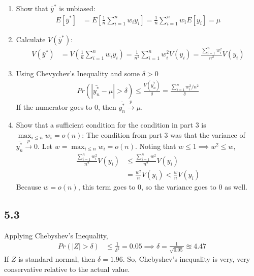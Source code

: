 \documentclass{article}[14pt]
\begin{document}
    \begin{enumerate}
        \item Show that $\bar{y}^*$ is unbiased:
        \begin{align*}
            E[\bar{y}^*] &= E[\frac{1}{n} \sum_{i=1}^n w_i y_i] = \frac{1}{n} \sum_{i=1}^n w_i E[y_i] = \mu
        \end{align*}
        \item Calculate $V(\bar{y}^*)$:
        \begin{align*}
            V(\bar{y}^*) &= V(\frac{1}{n} \sum_{i=1}^n w_i y_i) = \frac{1}{n^2} \sum_{i=1}^n w_i^2 V(y_i) = \frac{\sum_{i=1}^n w_i^2}{n^2} V(y_i)
        \end{align*}
        \item Using Chevychev's Inequality and some $\delta > 0$
        \begin{align*}
            Pr(|\bar{y^*_n} - \mu| > \delta) \leq \frac{V(\bar{y^*_n})}{\delta} = \frac{\sum_{i=1}^n w_i^2 / n^2}{\delta}
        \end{align*}
        If the numerator goes to 0, then $\bar{y^*_n} \overset{p}{\rightarrow} \mu$.
        \item Show that a sufficient condition for the condition in part 3 is $\max_{i \leq n} w_i = o(n)$: The condition from part 3 was that the variance of $\bar{y^*_n} \overset{p}{\rightarrow} 0$. Let $w = \max_{i \leq n} w_i = o(n)$. Noting that $w \leq 1 \implies w^2 \leq w$,
        \begin{align*}
            \frac{\sum_{i=1}^n w_i^2}{n^2} V(y_i) &\leq \frac{\sum_{i=1}^n w^2}{n^2} V(y_i) \\
            &= \frac{w^2}{n} V(y_i) < \frac{w}{n} V(y_i)
        \end{align*}
        Because $w = o(n)$, this term goes to 0, so the variance goes to 0 as well.
    \end{enumerate}
    \subsection*{5.3}
    Applying Chebyshev's Inequality,
    \begin{align*}
        Pr( |Z| > \delta) &\leq \frac{1}{\delta^2} = 0.05 \implies \delta = \frac{1}{\sqrt{0.05}} \approxeq 4.47
    \end{align*}
    If $Z$ is standard normal, then $\delta = 1.96$. So, Chebyshev's inequality is very, very conservative relative to the actual value.
\end{document}
